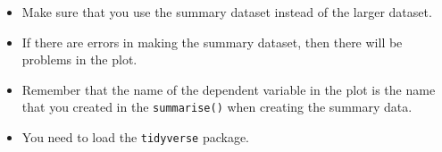 \documentclass[
]{book}
\providecommand{\tightlist}{%
  \setlength{\itemsep}{0pt}\setlength{\parskip}{0pt}}
\begin{document}
\begin{itemize}
\tightlist
\item
  Make sure that you use the summary dataset instead of the larger dataset.
\item
  If there are errors in making the summary dataset, then there will be problems in the plot.
\item
  Remember that the name of the dependent variable in the plot is the name that you created in the \texttt{summarise()} when creating the summary data.
\item
  You need to load the \texttt{tidyverse} package.
\end{itemize}

  
\end{document}

